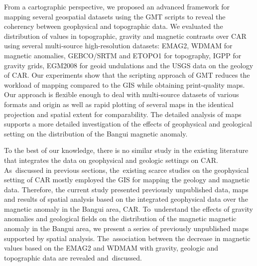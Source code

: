 \documentclass[minerals,article,accept,pdftex,moreauthors]{Definitions/mdpi}
\begin{document}
From a cartographic perspective, we proposed an advanced framework for mapping several geospatial datasets using the GMT scripts to reveal the coherency between geophysical and topographic data. We evaluated the distribution of values in topographic, gravity and magnetic contrasts over CAR using several multi-source high-resolution datasets: EMAG2, WDMAM for magnetic anomalies, GEBCO/SRTM and ETOPO1 for topography, IGPP for gravity grids, EGM2008 for geoid undulations and the USGS data on the geology of CAR. Our experiments show that the scripting approach of GMT {reduces} the workload of mapping compared to the {GIS} while{ }obtaining print-quality maps. Our approach is flexible enough to deal with multi-source datasets of various formats and origin as well as rapid plotting of several maps in the identical projection and spatial extent for comparability. {The detailed analysis of maps supports a more detailed investigation of the effects of geophysical and geological setting on the distribution of the Bangui magnetic anomaly.}

{To the best of our knowledge, there is no similar study in the existing literature that integrates the data on geophysical and geologic settings on CAR. As~discussed in previous sections, the~existing scarce studies on the geophysical setting of CAR mostly employed the GIS for mapping the geology and magnetic data. Therefore, the current study presented previously unpublished data, maps and results of spatial analysis based on the integrated geophysical data over the magnetic anomaly in the Bangui area, CAR. To~understand the effects of gravity anomalies and geological fields on the distribution of the magnetic magnetic anomaly in the Bangui area, we present a series of previously unpublished maps supported by spatial analysis. The~association between the decrease in magnetic values based on the EMAG2 and WDMAM with gravity, geologic and topographic data are revealed and~discussed.}
\end{document}
